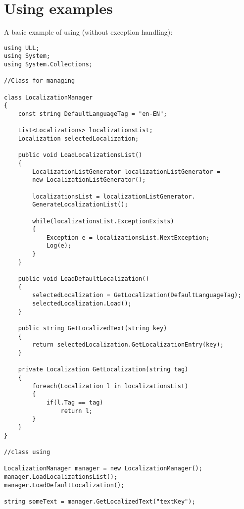 \documentclass[a4paper]{report}
\begin{document}
\chapter{Using examples}
A basic example of using (without exception handling):

\begin{lstlisting}[style=sharpc]
using ULL;
using System;
using System.Collections;

//Class for managing

class LocalizationManager
{
	const string DefaultLanguageTag = "en-EN";
	
	List<Localizations> localizationsList;
	Localization selectedLocalization;
	
	public void LoadLocalizationsList()
	{
		LocalizationListGenerator localizationListGenerator =
		new LocalizationListGenerator();
		
		localizationsList = localizationListGenerator.
		GenerateLocalizationList();
			
		while(localizationsList.ExceptionExists)
		{
			Exception e = localizationsList.NextException;
			Log(e);
		}
	}
	
	public void LoadDefaultLocalization()
	{
		selectedLocalization = GetLocalization(DefaultLanguageTag);
		selectedLocalization.Load();
	}
	
	public string GetLocalizedText(string key)
	{
		return selectedLocalization.GetLocalizationEntry(key);
	}
	
	private Localization GetLocalization(string tag)
	{
		foreach(Localization l in localizationsList)
		{
			if(l.Tag == tag)
				return l;
		}
	}
}

//class using

LocalizationManager manager = new LocalizationManager();
manager.LoadLocalizationsList();
manager.LoadDefaultLocalization();

string someText = manager.GetLocalizedText("textKey");
\end{lstlisting}
\end{document}
